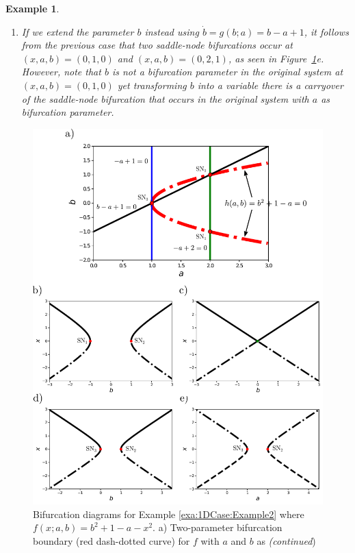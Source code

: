 \documentclass[12pt]{article}
\newtheorem{example}{Example}
\begin{document}
\begin{example}
\begin{enumerate}
        \item If we extend the parameter $b$ instead using $\dot b= g(b;a)=b-a+1$, it follows from the previous case that two saddle-node bifurcations occur at $(x,a,b)=(0,1,0)$ and $(x,a,b)=(0,2,1)$, as seen in Figure~\ref{fig:1DCase:Example2}e. However, note that $b$ is not a bifurcation parameter in the original system at $(x,a,b)=(0,1,0)$ yet transforming $b$ into a variable there is a carryover of the saddle-node bifurcation that occurs in the original system with $a$ as bifurcation parameter.
    \end{enumerate}
\end{example}

\begin{figure}
    \begin{center}
        \includegraphics[width=0.95\linewidth]{figures/Example2.pdf}
    \end{center}
    \caption[Bifurcation diagrams for Example \ref{exa:1DCase:Example2}.]{Bifurcation diagrams for Example \ref{exa:1DCase:Example2} where $f(x;a,b)=b^{2}+1-a-x^2$. a) Two-parameter bifurcation boundary (red dash-dotted curve) for $f$ with $a$ and $b$ as \linebreak \null \hfill \emph{(continued})}
    \label{fig:1DCase:Example2}
\end{figure}
\end{document}
